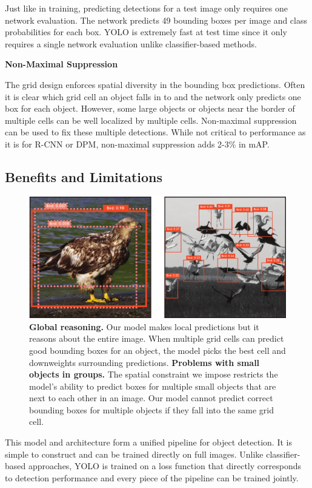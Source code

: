 \documentclass{article} %
\begin{document}
Just like in training, predicting detections for a test image only requires one network evaluation. The network predicts 49 bounding boxes per image and class probabilities for each box. YOLO is extremely fast at test time since it only requires a single network evaluation unlike classifier-based methods.

\textbf{Non-Maximal Suppression}

The grid design enforces spatial diversity in the bounding box predictions. Often it is clear which grid cell an object falls in to and the network only predicts one box for each object. However, some large objects or objects near the border of multiple cells can be well localized by multiple cells. Non-maximal suppression can be used to fix these multiple detections. While not critical to performance as it is for R-CNN or DPM, non-maximal suppression adds 2-3\% in mAP.

\subsection{Benefits and Limitations}

\begin{figure}[th]
\begin{center}
        \includegraphics[width=.8\linewidth]{bird}
\end{center}
   \caption{\textbf{Global reasoning.} Our model makes local predictions but it reasons about the entire image. When multiple grid cells can predict good bounding boxes for an object, the model picks the best cell and downweights surrounding predictions. \textbf{Problems with small objects in groups.} The spatial constraint we impose restricts the model's ability to predict boxes for multiple small objects that are next to each other in an image. Our model cannot predict correct bounding boxes for multiple objects if they fall into the same grid cell.}
\label{eagle}
\end{figure}

This model and architecture form a unified pipeline for object detection. It is simple to construct and can be trained directly on full images. Unlike classifier-based approaches, YOLO is trained on a loss function that directly corresponds to detection performance and every piece of the pipeline can be trained jointly.
\end{document}
